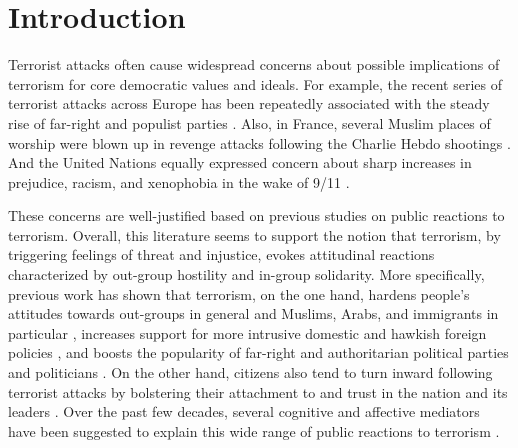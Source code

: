 \newpage
\section{Introduction}

Terrorist attacks often cause widespread concerns about possible implications of terrorism for core democratic values and ideals. For example, the recent series of terrorist attacks across Europe has been repeatedly associated with the steady rise of far-right and populist parties \citep{Fieschi2020}. Also, in France, several Muslim places of worship were blown up in revenge attacks following the Charlie Hebdo shootings \citep{Crone2015}. And the United Nations equally expressed concern about sharp increases in prejudice, racism, and xenophobia in the wake of 9/11 \citep{UNHCR2001}.


These concerns are well-justified based on previous studies on public reactions to terrorism. Overall, this literature seems to support the notion that terrorism, by triggering feelings of threat and injustice, evokes attitudinal reactions characterized by out-group hostility and in-group solidarity. More specifically, previous work has shown that terrorism, on the one hand, hardens people's attitudes towards out-groups in general and Muslims, Arabs, and immigrants in particular \citep[i.e., out-group hostility; see, e.g.,][]{Panagopoulos2006, Hopkins2010a, Echebarria-Echabe2009, Ferwerda2017}, increases support for more intrusive domestic and hawkish foreign policies \citep[e.g.,][]{Gadarian2010c, Davis2004, Fisk2019a}, and boosts the popularity of far-right and authoritarian political parties and politicians \citep[i.e., conservative shift; see, e.g.,][]{Vasilopoulos2019c, Nagoshi2008, Linden2018a, Marcus2019}. On the other hand, citizens also tend to turn inward following terrorist attacks by bolstering their attachment to and trust in the nation and its leaders \citep[i.e., rally-‘round-the-flag; see, e.g.,][]{VanHauwaert2020a, Dinesen2013a, Feinstein2018, Landau2004, Ladd2007, Lambert2010}. Over the past few decades, several cognitive and affective mediators have been suggested to explain this wide range of public reactions to terrorism \citep[e.g.,][]{Pyszczynski2003, Vasilopoulos2019c, Jost2019, Jost2017a, Marcus2019}.


